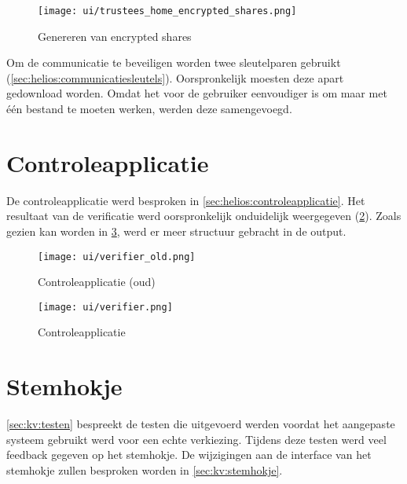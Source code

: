 \begin{figure}
  \centering
  \texttt{[image: ui/trustees\_home\_encrypted\_shares.png]}
  \caption{Genereren van encrypted shares}
  \label{fig:ui:trustees_home_encrypted_shares}
\end{figure}

\npar Om de communicatie te beveiligen worden twee sleutelparen gebruikt (\ref{sec:helios:communicatiesleutels}). Oorspronkelijk moesten deze apart gedownload worden. Omdat het voor de gebruiker eenvoudiger is om maar met \'e\'en bestand te moeten werken, werden deze samengevoegd.

\section{Controleapplicatie}
\label{sec:ui:controleapplicatie}

De controleapplicatie werd besproken in \ref{sec:helios:controleapplicatie}. Het resultaat van de verificatie werd oorspronkelijk onduidelijk weergegeven  (\ref{fig:ui:verifier_old}). Zoals gezien kan worden in \ref{fig:ui:verifier}, werd er meer structuur gebracht in de output.

\begin{figure}
  \centering
  \texttt{[image: ui/verifier\_old.png]}
  \caption{Controleapplicatie (oud)}
  \label{fig:ui:verifier_old}
\end{figure}

\begin{figure}
  \centering
  \texttt{[image: ui/verifier.png]}
  \caption{Controleapplicatie}
  \label{fig:ui:verifier}
\end{figure}

\section{Stemhokje}
\label{sec:ui:stemhokje}

\ref{sec:kv:testen} bespreekt de testen die uitgevoerd werden voordat het aangepaste systeem gebruikt werd voor een echte verkiezing. Tijdens deze testen werd veel feedback gegeven op het stemhokje. De wijzigingen aan de interface van het stemhokje zullen besproken worden in \ref{sec:kv:stemhokje}.